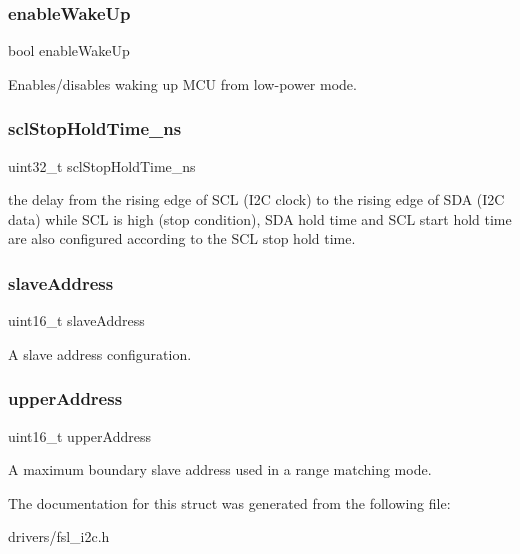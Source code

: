 \subsubsection{\texorpdfstring{enableWakeUp}{enableWakeUp}}
{\footnotesize\ttfamily bool enable\+Wake\+Up}

Enables/disables waking up M\+CU from low-\/power mode. \mbox{\label{struct__i2c__slave__config_addd2f572e0c2ccf835347068518752a8}} 
\subsubsection{\texorpdfstring{sclStopHoldTime\_ns}{sclStopHoldTime\_ns}}
{\footnotesize\ttfamily uint32\+\_\+t scl\+Stop\+Hold\+Time\+\_\+ns}

the delay from the rising edge of S\+CL (I2C clock) to the rising edge of S\+DA (I2C data) while S\+CL is high (stop condition), S\+DA hold time and S\+CL start hold time are also configured according to the S\+CL stop hold time. \mbox{\label{struct__i2c__slave__config_a67af74c3fc959654c6dc8bcff3a2ea80}} 
\subsubsection{\texorpdfstring{slaveAddress}{slaveAddress}}
{\footnotesize\ttfamily uint16\+\_\+t slave\+Address}

A slave address configuration. \mbox{\label{struct__i2c__slave__config_a959e9269b2e7e83f1c4aebac870bf822}} 
\subsubsection{\texorpdfstring{upperAddress}{upperAddress}}
{\footnotesize\ttfamily uint16\+\_\+t upper\+Address}

A maximum boundary slave address used in a range matching mode. 

The documentation for this struct was generated from the following file\+:\begin{DoxyCompactItemize}
\item 
drivers/fsl\+\_\+i2c.\+h\end{DoxyCompactItemize}
